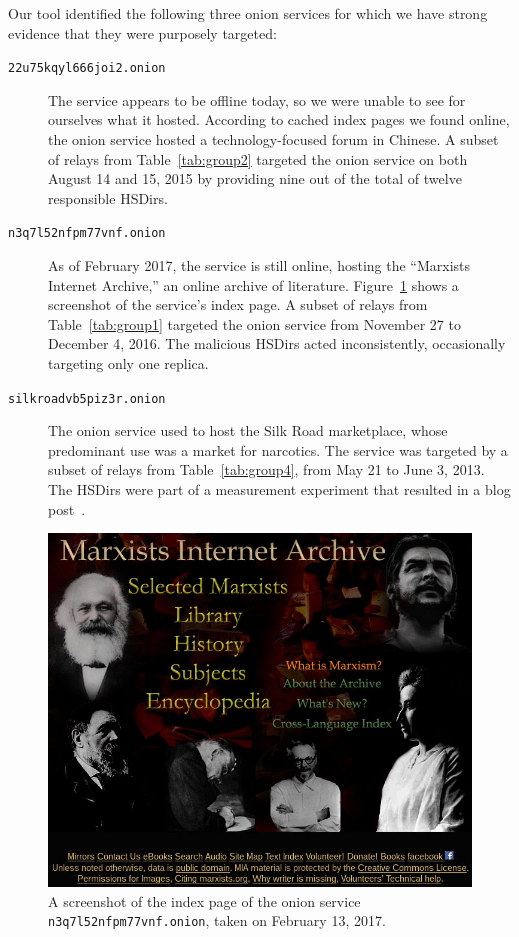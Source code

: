Our tool identified the following three onion services for which we have strong
evidence that they were purposely targeted:

\begin{description}
	\item[\texttt{22u75kqyl666joi2.onion}] The service appears to be offline
		today, so we were unable to see for ourselves what it hosted.  According
		to cached index pages we found online, the onion service hosted a
		technology-focused forum in Chinese.  A subset of relays from
		Table~\ref{tab:group2} targeted the onion service on both August 14 and
		15, 2015 by providing nine out of the total of twelve responsible
		HSDirs.

	\item[\texttt{n3q7l52nfpm77vnf.onion}] As of February 2017, the service is
		still online, hosting the ``Marxists Internet Archive,'' an online
		archive of literature.  Figure~\ref{fig:archive} shows a screenshot of
		the service's index page.  A subset of relays from
		Table~\ref{tab:group1} targeted the onion service from November 27 to
		December 4, 2016.  The malicious HSDirs acted inconsistently,
		occasionally targeting only one replica.

	\item[\texttt{silkroadvb5piz3r.onion}] The onion service used to host the
		Silk Road marketplace, whose predominant use was a market for narcotics.
		The service was targeted by a subset of relays from
		Table~\ref{tab:group4}, from May 21 to June 3, 2013.  The HSDirs were
		part of a measurement experiment that resulted in a blog
		post~\cite{OCearbhaill2013a}.
\end{description}

\begin{figure}[t]
	\centering
	\includegraphics[width=\linewidth]{figures/marxists-internet-archive.jpg}
	\caption{A screenshot of the index page of the onion service
		\texttt{n3q7l52nfpm77vnf.onion}, taken on February 13, 2017.}
	\label{fig:archive}
\end{figure}
